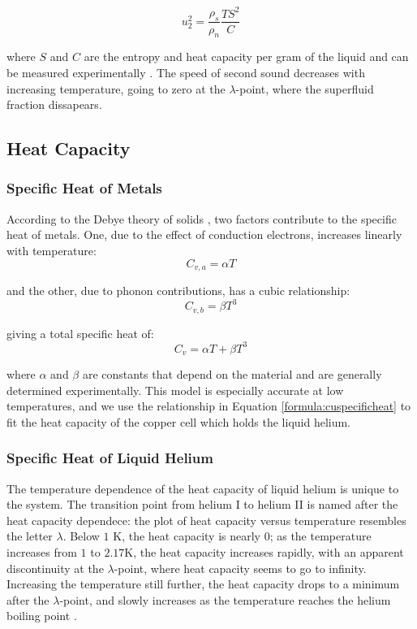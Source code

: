 \begin{equation}
u_2^2 = \frac{\rho_s}{\rho_n}\frac{T S^2}{C}
\label{eqn:soundspeed}
\end{equation}

where $S$ and $C$ are the entropy and heat capacity per gram of the
liquid and can be measured experimentally \cite{atkins}. The
speed of second sound decreases with increasing temperature, going
to zero at the $\lambda$-point, where the superfluid fraction
dissapears.

\subsection{Heat Capacity}\label{heatcapacity}

\subsubsection{Specific Heat of Metals}\label{specificheatofmetals}

According to the Debye theory of solids \cite{schroeder}, two factors contribute to the
specific heat of metals. One, due to the effect of conduction electrons, increases linearly with temperature:
\begin{equation}
C_{v,a} = \alpha T
\end{equation}

and the other, due to phonon contributions, has a cubic relationship:
\begin{equation}
C_{v,b} = \beta T^3
\end{equation}

giving a total specific heat of:
\begin{equation}\label{formula:cuspecificheat}
C_v=  \alpha T + \beta T^3
\end{equation}

where $\alpha$ and $\beta$ are constants that depend on the material
and are generally determined experimentally. This model is especially accurate
at low temperatures, and we use the relationship in Equation
\ref{formula:cuspecificheat} to fit the heat capacity of the copper
cell which holds the liquid helium.

\subsubsection{Specific Heat of Liquid Helium}\label{specificheatofliquidhelium}

The temperature dependence of the heat capacity of liquid helium is
unique to the system. The transition point from helium I to helium II
is named after the heat capacity dependece: the plot of heat capacity
versus temperature resembles the letter $\lambda$. Below $1$ K, the
heat capacity is nearly $0$; as the temperature increases from $1$ to
$2.17$K, the heat capacity increases rapidly, with an apparent
discontinuity at the $\lambda$-point, where heat capacity seems
to go to infinity. Increasing the temperature still further, the
heat capacity drops to a minimum after the $\lambda$-point, and slowly
increases as the temperature reaches the helium boiling point \cite{atkins}.

